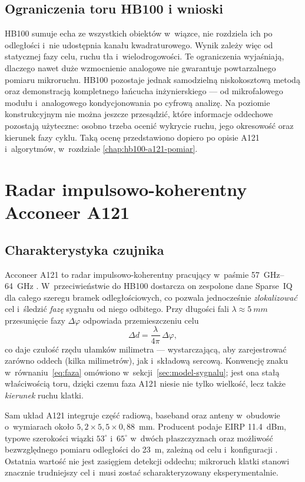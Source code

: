 \documentclass[12pt,a4paper,oneside]{report}
\begin{document}
\section{Ograniczenia toru HB100 i wnioski}
HB100 sumuje echa ze wszystkich obiektów w~wiązce, nie rozdziela ich po
odległości i~nie udostępnia kanału kwadraturowego. Wynik zależy więc od
statycznej fazy celu, ruchu tła i~wielodrogowości. Te ograniczenia wyjaśniają,
dlaczego nawet duże wzmocnienie analogowe nie gwarantuje powtarzalnego pomiaru
mikroruchu. HB100 pozostaje jednak samodzielną niskokosztową metodą oraz
demonstracją kompletnego łańcucha inżynierskiego --- od mikrofalowego modułu
i~analogowego kondycjonowania po cyfrową analizę. Na poziomie konstrukcyjnym
nie można jeszcze przesądzić, które informacje oddechowe pozostają użyteczne:
osobno trzeba ocenić wykrycie ruchu, jego okresowość oraz kierunek fazy cyklu.
Taką ocenę przedstawiono dopiero po opisie A121 i~algorytmów, w~rozdziale
\ref{chap:hb100-a121-pomiar}.

\chapter{Radar impulsowo-koherentny Acconeer A121}
\label{chap:a121}

\section{Charakterystyka czujnika}
Acconeer A121 to radar impulsowo-koherentny pracujący w~paśmie
\SIrange{57}{64}{GHz} \cite{acconeer_datasheet}.
W~przeciwieństwie do HB100 dostarcza on zespolone dane Sparse~IQ dla całego
szeregu bramek odległościowych, co pozwala jednocześnie \emph{zlokalizować}
cel i~śledzić \emph{fazę} sygnału od niego odbitego. Przy długości fali
$\lambda \approx \SI{5}{mm}$ przesunięcie fazy $\Delta\varphi$ odpowiada
przemieszczeniu celu
\begin{equation}
    \Delta d = \frac{\lambda}{4\pi}\,\Delta\varphi ,
    \label{eq:faza}
\end{equation}
co daje czułość rzędu ułamków milimetra --- wystarczającą, aby zarejestrować
zarówno oddech (kilka milimetrów), jak i~składową sercową. Konwencję znaku
w~równaniu~\eqref{eq:faza} omówiono w~sekcji~\ref{sec:model-sygnalu}; jest ona
stałą właściwością toru, dzięki czemu faza A121 niesie nie tylko wielkość, lecz
także \emph{kierunek} ruchu klatki.

Sam układ A121 integruje część radiową, baseband oraz anteny w~obudowie
o~wymiarach około $5{,}2\times5{,}5\times0{,}88$~mm. Producent podaje EIRP
\SI{11.4}{dBm}, typowe szerokości wiązki $53^\circ$ i~$65^\circ$ w~dwóch
płaszczyznach oraz możliwość bezwzględnego pomiaru odległości do \SI{23}{m},
zależną od celu i~konfiguracji \cite{acconeer_datasheet}. Ostatnia wartość nie
jest zasięgiem detekcji oddechu; mikroruch klatki stanowi znacznie trudniejszy
cel i~musi zostać scharakteryzowany eksperymentalnie.
\end{document}
